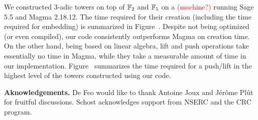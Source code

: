 \documentclass{sig-alternate}
\newcommand{\todo}[1]{\textcolor{red}{(#1)}}
\begin{document}
We constructed $3$-adic towers on top of $\mathbb{F}_2$ and $\mathbb{F}_5$ on a
\todo{machine?} running Sage 5.5 and Magma 2.18.12. The time required
for their creation (including the time required for embedding) is
summarized in Figure~. Despite not being optimized (or even compiled),
our code consistently outperforms Magma on creation time. On the other
hand, being based on linear algebra, lift and push operations take
essentially no time in Magma, while they take a measurable amount of
time in our implementation. Figure~ summarizes the time required for a
push/lift in the highest level of the towers constructed using our
code.



\bigskip\noindent \textbf{Aknowledgements.}  De Feo would like to thank Antoine
Joux and J\'er\^ome Pl\^ut for fruitful discussions. Schost acknowledges
support from NSERC and the CRC program.

\scriptsize


\end{document}
